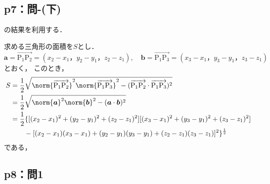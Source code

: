 \documentclass[uplatex,dvipdfmx,a4paper,10pt,fleqn]{jsarticle}
\begin{document}
    \subsection*{p7：問-(下)}
\begin{tleftbar}
	[1.4]の結果を利用する．

	求める三角形の面積を$S$とし．
    \[
    \bm{a}=\overrightarrow{\mathrm{P_1 P_2}}=(x_2-x_1，y_2-y_1，z_2-z_1),\quad \bm{b}=\overrightarrow{\mathrm{P_1 P_3}}=(x_3-x_1，y_3-y_1，z_3-z_1)
    \]
    とおく，
	このとき，
	\begin{align*}
		S & = \frac{1}{2} \sqrt{\norm{\overrightarrow{\mathrm{P_1 P_2}}}^2 \norm{\overrightarrow{\mathrm{P_1 P_3}}}^2 - (\overrightarrow{\mathrm{P_1 P_2}} \cdot \overrightarrow{\mathrm{P_1 P_3}})^2} \\
		  & = \frac{1}{2} \sqrt{\norm{\bm{a}}^2 \norm{\bm{b}}^2 - (\bm{a}\cdot \bm{b})^2 } \\
		  & = \frac{1}{2} \{[(x_2 - x_1)^2+(y_2-y_1)^2+ (z_2 - z_1)^2][(x_3 - x_1)^2+(y_3-y_1)^2+ (z_3 - z_1)^2]\\
		  & \qquad - [(x_2-x_1)(x_3-x_1)+(y_2 -y_1)(y_3-y_1)+(z_2-z_1)(z_3-z_1)]^2\}^{\frac{1}{2}}
	\end{align*}
	である，
\end{tleftbar}
	
\newpage

\subsection*{p8：問1}
\end{document}
